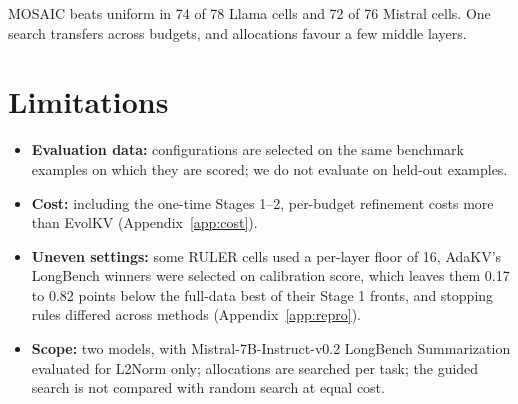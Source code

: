 \documentclass[11pt]{article}
\begin{document}
MOSAIC beats uniform in 74 of 78 Llama cells and 72 of 76 Mistral cells. One search transfers across budgets, and allocations favour a few middle layers.

\clearpage
\section*{Limitations}

\begin{itemize}
\item \textbf{Evaluation data:} configurations are selected on the same benchmark examples on which they are scored; we do not evaluate on held-out examples.
\item \textbf{Cost:} including the one-time Stages 1--2, per-budget refinement costs more than EvolKV (Appendix~\ref{app:cost}).
\item \textbf{Uneven settings:} some RULER cells used a per-layer floor of 16, AdaKV's LongBench winners were selected on calibration score, which leaves them 0.17 to 0.82 points below the full-data best of their Stage 1 fronts, and stopping rules differed across methods (Appendix~\ref{app:repro}).
\item \textbf{Scope:} two models, with Mistral-7B-Instruct-v0.2 LongBench Summarization evaluated for L2Norm only; allocations are searched per task; the guided search is not compared with random search at equal cost.
\end{itemize}

\FloatBarrier




\end{document}
